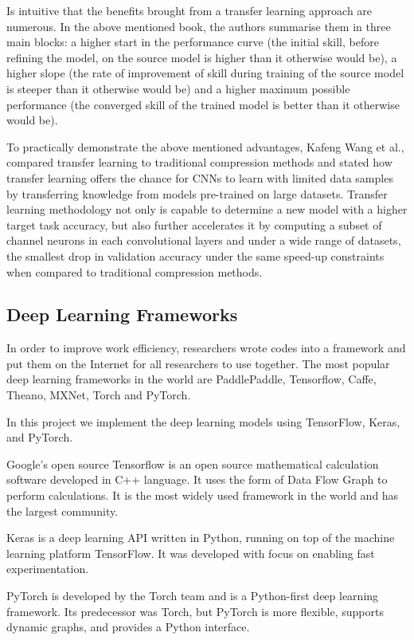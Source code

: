 \documentclass[conference]{IEEEtran}
\begin{document}
Is intuitive that the benefits brought from a transfer learning approach are numerous. In the above mentioned book, the authors summarise them in three main blocks: a higher start in the performance curve (the initial skill, before refining the model, on the source model is higher than it otherwise would be), a higher slope (the rate of improvement of skill during training of the source model is steeper than it otherwise would be) and a higher maximum possible performance (the converged skill of the trained model is better than it otherwise would be).

To practically demonstrate the above mentioned advantages, Kafeng Wang et al.,\cite{Wang2020PayAT} compared transfer learning to traditional compression methods and stated  how transfer learning offers the chance for CNNs to learn with limited data samples by transferring knowledge from models pre-trained on large datasets. Transfer learning methodology not only is capable to determine a new model with a higher target task accuracy, but also further accelerates it by computing a subset of channel neurons in each convolutional layers and under a wide range of datasets, the smallest drop in validation accuracy under the same speed-up constraints when compared to traditional compression methods.


\subsection{ Deep Learning Frameworks}
In order to improve work efficiency, researchers wrote codes into a framework and put them on the Internet for all researchers to use together. The most popular deep learning frameworks in the world are PaddlePaddle, Tensorflow, Caffe, Theano, MXNet, Torch and PyTorch. 

In this project we implement the deep learning models using TensorFlow, Keras, and PyTorch. 

Google's open source Tensorflow is an open source mathematical calculation software developed in C++ language. It uses the form of Data Flow Graph to perform calculations. It is the most widely used framework in the world and has the largest community. 

Keras is a deep learning API written in Python, running on top of the machine learning platform TensorFlow. It was developed with focus on enabling fast experimentation.

PyTorch is developed by the Torch team and is a Python-first deep learning framework. Its predecessor was Torch, but PyTorch is more flexible, supports dynamic graphs, and provides a Python interface. 
\end{document}
